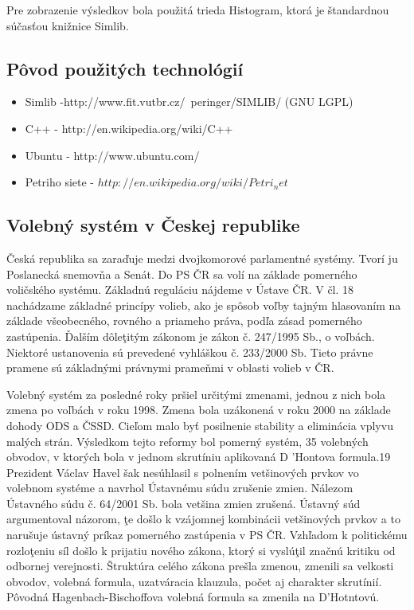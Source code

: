 \documentclass[12pt,a4paper,titlepage,final]{article}
\begin{document}
Pre zobrazenie výsledkov bola použitá trieda Histogram, ktorá je štandardnou súčasťou knižnice Simlib.

\subsection{Pôvod použitých technológií}
\begin{itemize}
\item Simlib -http://www.fit.vutbr.cz/~peringer/SIMLIB/ (GNU LGPL)
\item C++ - http://en.wikipedia.org/wiki/C++
\item Ubuntu - http://www.ubuntu.com/
\item Petriho siete - $http://en.wikipedia.org/wiki/Petri_net$
\end{itemize}
\subsection{Volebný systém v Českej republike}
Česká republika sa zaraďuje medzi dvojkomorové parlamentné 
systémy. Tvorí ju Poslanecká snemovňa a Senát. Do PS ČR sa volí na 
základe pomerného voličského systému. Základnú reguláciu nájdeme 
v Ústave ČR. V čl. 18 nachádzame základné princípy volieb, ako je spôsob 
voľby tajným hlasovaním na základe všeobecného, rovného a priameho 
práva, podľa zásad pomerného zastúpenia. Ďalším dôleţitým zákonom je 
zákon č. 247/1995 Sb., o voľbách. Niektoré ustanovenia sú prevedené 
vyhláškou č. 233/2000 Sb. Tieto právne pramene sú základnými právnymi 
prameňmi v oblasti volieb v ČR. 
 
Volebný systém za posledné roky pršiel určitými zmenami, jednou 
z nich bola zmena po voľbách v roku 1998. Zmena bola uzákonená v roku 
2000 na základe dohody ODS a ČSSD. Cieľom malo byť posilnenie 
stability a eliminácia vplyvu malých strán. Výsledkom tejto reformy bol 
pomerný systém, 35 volebných obvodov, v ktorých bola v jednom skrutíniu 
aplikovaná D 'Hontova formula.19
 Prezident Václav Havel šak nesúhlasil 
s polnením vetšinových prvkov vo volebnom systéme a navrhol Ústavnému 
súdu zrušenie zmien. Nálezom Ústavného súdu č. 64/2001 Sb. bola vetšina 
zmien zrušená. Ústavný súd argumentoval názorom, ţe došlo k vzájomnej 
kombinácii vetšinových prvkov a to narušuje ústavný príkaz pomerného 
zastúpenia v PS ČR. Vzhľadom k politickému rozloţeniu síl došlo k prijatiu 
nového zákona, ktorý si vyslúţil značnú kritiku od odbornej verejnosti. 
Štruktúra celého zákona prešla zmenou, zmenili sa velkosti obvodov, 
volebná formula, uzatváracia klauzula, počet aj charakter skrutínií. Pôvodná 
Hagenbach-Bischoffova volebná formula sa zmenila na D'Hotntovú. 
 
\end{document}
